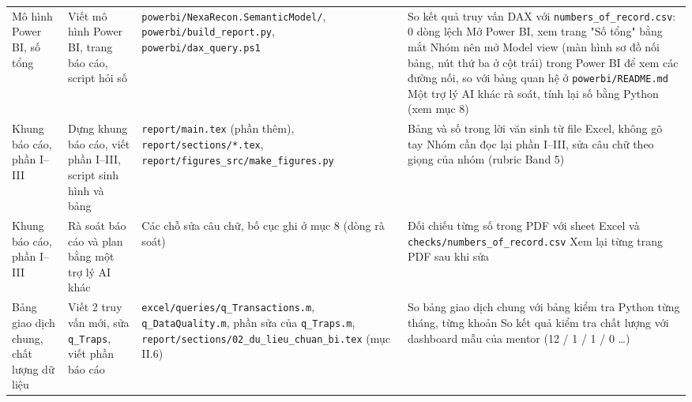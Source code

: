 {\begin{longtable}{@{}L{2.1cm} L{3.6cm} L{4.2cm} L{5.2cm}@{}}
Mô hình Power BI, số tổng & Viết mô hình Power BI, trang báo cáo, script hỏi số & \texttt{powerbi/\allowbreak{}NexaRecon.\allowbreak{}SemanticModel/\allowbreak{}}, \texttt{powerbi/\allowbreak{}build\_\allowbreak{}report.\allowbreak{}py}, \texttt{powerbi/\allowbreak{}dax\_\allowbreak{}query.\allowbreak{}ps1} & \textbullet{} So kết quả truy vấn DAX với \texttt{numbers\_\allowbreak{}of\_\allowbreak{}record.\allowbreak{}csv}: 0 dòng lệch \newline \textbullet{} Mở Power BI, xem trang "Số tổng" bằng mắt \newline \textbullet{} Nhóm nên mở Model view (màn hình sơ đồ nối bảng, nút thứ ba ở cột trái) trong Power BI để xem các đường nối, so với bảng quan hệ ở \texttt{powerbi/\allowbreak{}README.\allowbreak{}md} \newline \textbullet{} Một trợ lý AI khác rà soát, tính lại số bằng Python (xem mục 8) \\
Khung báo cáo, phần I–III & Dựng khung báo cáo, viết phần I–III, script sinh hình và bảng & \texttt{report/\allowbreak{}main.\allowbreak{}tex} (phần thêm), \texttt{report/\allowbreak{}sections/\allowbreak{}*.\allowbreak{}tex}, \texttt{report/\allowbreak{}figures\_\allowbreak{}src/\allowbreak{}make\_\allowbreak{}figures.\allowbreak{}py} & \textbullet{} Bảng và số trong lời văn sinh từ file Excel, không gõ tay \newline \textbullet{} Nhóm cần đọc lại phần I–III, sửa câu chữ theo giọng của nhóm (rubric Band 5) \\
Khung báo cáo, phần I–III & Rà soát báo cáo và plan bằng một trợ lý AI khác & Các chỗ sửa câu chữ, bố cục ghi ở mục 8 (dòng rà soát) & \textbullet{} Đối chiếu từng số trong PDF với sheet Excel và \texttt{checks/\allowbreak{}numbers\_\allowbreak{}of\_\allowbreak{}record.\allowbreak{}csv} \newline \textbullet{} Xem lại từng trang PDF sau khi sửa \\
Bảng giao dịch chung, chất lượng dữ liệu & Viết 2 truy vấn mới, sửa \texttt{q\_\allowbreak{}Traps}, viết phần báo cáo & \texttt{excel/\allowbreak{}queries/\allowbreak{}q\_\allowbreak{}Transactions.\allowbreak{}m}, \texttt{q\_\allowbreak{}DataQuality.\allowbreak{}m}, phần sửa của \texttt{q\_\allowbreak{}Traps.\allowbreak{}m}, \texttt{report/\allowbreak{}sections/\allowbreak{}02\_\allowbreak{}du\_\allowbreak{}lieu\_\allowbreak{}chuan\_\allowbreak{}bi.\allowbreak{}tex} (mục II.6) & \textbullet{} So bảng giao dịch chung với bảng kiểm tra Python từng tháng, từng khoản \newline \textbullet{} So kết quả kiểm tra chất lượng với dashboard mẫu của mentor (12 / 1 / 1 / 0 \ldots{}) \\

\end{longtable}}
